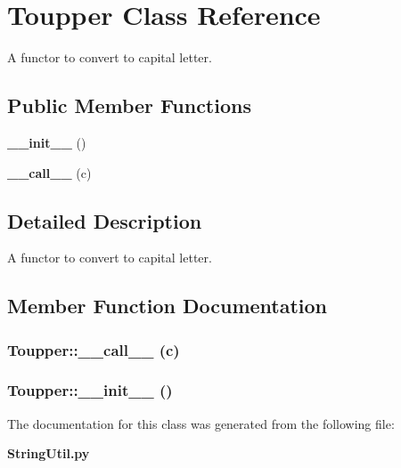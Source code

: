 \section{Toupper Class Reference}
\label{classToupper}
A functor to convert to capital letter.  


\subsection*{Public Member Functions}
\begin{CompactItemize}
\item 
{\bf \_\-\_\-init\_\-\_\-} ()
\item 
{\bf \_\-\_\-call\_\-\_\-} (c)
\end{CompactItemize}


\subsection{Detailed Description}
A functor to convert to capital letter. 



\subsection{Member Function Documentation}
\subsubsection{\setlength{\rightskip}{0pt plus 5cm}Toupper::\_\-\_\-call\_\-\_\- (c)}\label{classToupper_Touppera1}


\subsubsection{\setlength{\rightskip}{0pt plus 5cm}Toupper::\_\-\_\-init\_\-\_\- ()}\label{classToupper_Touppera0}




The documentation for this class was generated from the following file:\begin{CompactItemize}
\item 
{\bf String\-Util.py}\end{CompactItemize}
